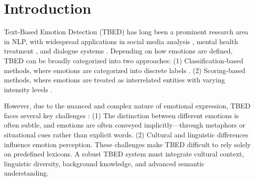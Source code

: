 \documentclass[11pt]{article}
\begin{document}
\section{Introduction}

Text-Based Emotion Detection (TBED) has long been a prominent research area in NLP, with widespread applications in social media analysis \cite{kuamri2017real, salam2018emotion, cassab2020ontology}, mental health treatment \cite{kusal2021ai, krommyda2021experimental}, and dialogue systems \cite{liu2022dialogueein,ide2022building,hu2021dialoguecrn}. Depending on how emotions are defined, TBED can be broadly categorized into two approaches: (1) Classification-based methods, where emotions are categorized into discrete labels \cite{ekman1969repertoire,plutchik1982psycho}. (2) Scoring-based methods, where emotions are treated as interrelated entities with varying intensity levels \cite{russell1977evidence}. 

However, due to the nuanced and complex nature of emotional expression, TBED faces several key challenges \cite{al2024challenges}: (1) The distinction between different emotions is often subtle, and emotions are often conveyed implicitly—through metaphors or situational cues rather than explicit words. (2) Cultural and linguistic differences influence emotion perception. These challenges make TBED difficult to rely solely on predefined lexicons. A robust TBED system must integrate cultural context, linguistic diversity, background knowledge, and advanced semantic understanding.
\end{document}
